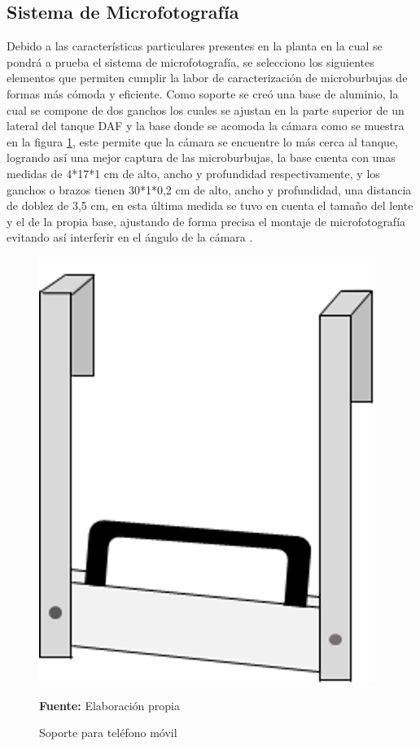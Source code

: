 \documentclass[12pt,twocolumn,a4paper]{article}
\begin{document}
\subsection{Sistema de Microfotografía}

Debido a las características particulares presentes en la planta en la cual se pondrá a prueba el sistema de microfotografía, se selecciono los siguientes elementos que permiten cumplir la labor de caracterización de microburbujas de formas más cómoda y eficiente. Como soporte se creó una base de aluminio, la cual  se compone de dos ganchos los cuales se ajustan en la parte superior de un lateral del tanque DAF y la base donde se acomoda la cámara como se muestra en la figura \ref{soporte}, este permite que la cámara se encuentre lo más cerca al tanque, logrando así una mejor captura de las microburbujas, la base cuenta con unas medidas de 4*17*1 cm de alto, ancho y profundidad respectivamente, y los ganchos o brazos tienen   30*1*0,2 cm de alto, ancho y profundidad, una distancia de doblez  de 3,5 cm,  en esta última medida se tuvo en cuenta el tamaño del lente y el de la propia base, ajustando de forma precisa el montaje de microfotografía evitando así interferir en el ángulo de la cámara \cite{tripode}. 

\begin{figure}[h]
	\centering
	\includegraphics[scale=0.5]{soporte.png}
	\caption{Soporte para teléfono móvil} \textbf{Fuente:} Elaboración propia
	\label{soporte}
\end{figure}
\end{document}
